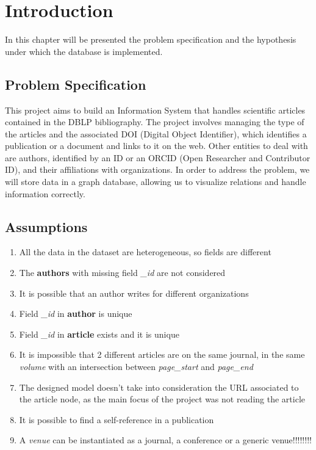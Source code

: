 \documentclass{Configuration_Files/PoliMi3i_thesis}
\begin{document}
\mainmatter %

\chapter{Introduction}
\label{ch:introduction}%

In this chapter will be presented the problem specification and the hypothesis under which the database is implemented.

\section{Problem Specification}
\label{sec:prob_specs}
This project aims to build an Information System that handles scientific articles contained in the DBLP
bibliography. The project involves managing the type of the articles and the associated DOI (Digital Object Identifier),
which identifies a publication or a document and links to it on the web. Other entities to deal with are authors, identified by
an ID or an ORCID (Open Researcher and Contributor ID), and their affiliations with organizations. In order to address the
problem, we will store data in a graph database, allowing us to visualize relations and handle information correctly.


\section{Assumptions}
\label{sec:assumptions}
\begin{enumerate}
    \item All the data in the dataset are heterogeneous, so fields are different
    \item The \textbf{authors} with missing field \emph{\_id} are not considered
    \item It is possible that an author writes for different organizations
    \item Field \emph{\_id} in \textbf{author} is unique
    \item Field \emph{\_id} in \textbf{article} exists and it is unique
    \item It is impossible that 2 different articles are on the same journal, in the same \emph{volume} with an intersection between \emph{page\_start} and \emph{page\_end}
    \item The designed model doesn't take into consideration the URL associated to the article node, as the main focus of the project was not reading the article
    \item It is possible to find a self-reference in a publication
    \item A \emph{venue} can be instantiated as a journal, a conference or a generic venue!!!!!!!!
\end{enumerate}
\end{document}
